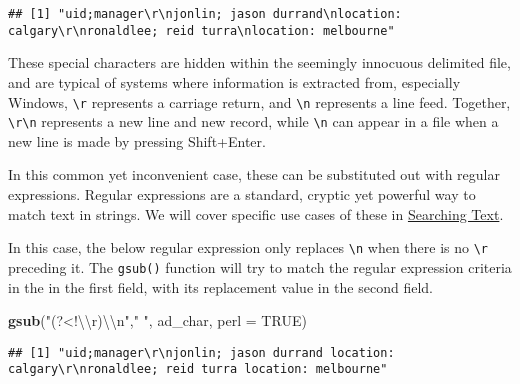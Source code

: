 \documentclass[
]{book}
\newenvironment{Shaded}{\begin{snugshade}}{\end{snugshade}}
\newcommand{\CharTok}[1]{\textcolor[rgb]{0.31,0.60,0.02}{#1}}
\newcommand{\DataTypeTok}[1]{\textcolor[rgb]{0.13,0.29,0.53}{#1}}
\newcommand{\KeywordTok}[1]{\textcolor[rgb]{0.13,0.29,0.53}{\textbf{#1}}}
\newcommand{\NormalTok}[1]{#1}
\newcommand{\OperatorTok}[1]{\textcolor[rgb]{0.81,0.36,0.00}{\textbf{#1}}}
\newcommand{\OtherTok}[1]{\textcolor[rgb]{0.56,0.35,0.01}{#1}}
\newcommand{\StringTok}[1]{\textcolor[rgb]{0.31,0.60,0.02}{#1}}
\begin{document}
\begin{Shaded}
\end{Shaded}

\begin{verbatim}
## [1] "uid;manager\r\njonlin; jason durrand\nlocation: calgary\r\nronaldlee; reid turra\nlocation: melbourne"
\end{verbatim}

These special characters are hidden within the seemingly innocuous delimited file, and are typical of systems where information is extracted from, especially Windows, \texttt{\textbackslash{}r} represents a carriage return, and \texttt{\textbackslash{}n} represents a line feed. Together, \texttt{\textbackslash{}r\textbackslash{}n} represents a new line and new record, while \texttt{\textbackslash{}n} can appear in a file when a new line is made by pressing Shift+Enter.

In this common yet inconvenient case, these can be substituted out with regular expressions. Regular expressions are a standard, cryptic yet powerful way to match text in strings. We will cover specific use cases of these in \protect\hyperlink{test-searchtext}{Searching Text}.

In this case, the below regular expression only replaces \texttt{\textbackslash{}n} when there is no \texttt{\textbackslash{}r} preceding it. The \texttt{gsub()} function will try to match the regular expression criteria in the in the first field, with its replacement value in the second field.

\begin{Shaded}
\begin{Highlighting}[]
\KeywordTok{gsub}\NormalTok{(}\StringTok{"(?<!}\CharTok{\textbackslash{}\textbackslash{}}\StringTok{r)}\CharTok{\textbackslash{}\textbackslash{}}\StringTok{n"}\NormalTok{,}\StringTok{" "}\NormalTok{, ad_char, }\DataTypeTok{perl =} \OtherTok{TRUE}\NormalTok{)}
\end{Highlighting}
\end{Shaded}

\begin{verbatim}
## [1] "uid;manager\r\njonlin; jason durrand location: calgary\r\nronaldlee; reid turra location: melbourne"
\end{verbatim}
\end{document}
